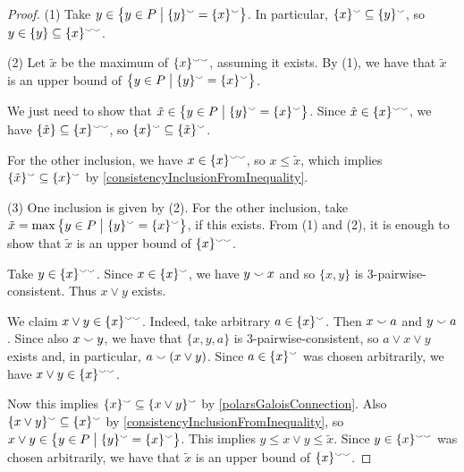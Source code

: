 \begin{proof}
(1) Take $y\in \setbuilder[\big]{y\in P}{\{y\}^\cons = \{x\}^\cons}$. In particular, $\{x\}^\smallsmile \subseteq \{y\}^\smallsmile$, so $y\in \{y\} \subseteq \{x\}^{\smallsmile\smallsmile}$.

(2) Let $\tilde{x}$ be the maximum of $\{x\}^{\smallsmile\smallsmile}$, assuming it exists. By (1), we have that $\tilde{x}$ is an upper bound of $\setbuilder[\big]{y\in P}{\{y\}^\cons = \{x\}^\cons}$.

We just need to show that $\tilde{x} \in \setbuilder[\big]{y\in P}{\{y\}^\cons = \{x\}^\cons}$. Since $\tilde{x} \in \{x\}^{\smallsmile\smallsmile}$, we have $\{\tilde{x}\} \subseteq \{x\}^{\smallsmile\smallsmile}$, so $\{x\}^\smallsmile \subseteq \{\tilde{x}\}^\smallsmile$.

For the other inclusion, we have $x\in \{x\}^{\smallsmile\smallsmile}$, so $x \leq \tilde{x}$, which implies $\{\tilde{x}\}^\smallsmile \subseteq \{x\}^\smallsmile$ by \ref{consistencyInclusionFromInequality}.

(3) One inclusion is given by (2). For the other inclusion, take $\tilde{x} = \max \setbuilder[\big]{y\in P}{ \{y\}^\cons = \{x\}^\cons }$, if this exists. From (1) and (2), it is enough to show that $\tilde{x}$ is an upper bound of $\{x\}^{\smallsmile\smallsmile}$.

Take $y\in \{x\}^{\smallsmile\smallsmile}$. Since $x\in \{x\}^\smallsmile$, we have $y \smallsmile x$ and so $\{x,y\}$ is $3$-pairwise-consistent. Thus $x\vee y$ exists.

We claim $x\vee y\in \{x\}^{\smallsmile\smallsmile}$. Indeed, take arbitrary $a\in \{x\}^\smallsmile$. Then $x\smallsmile a$ and $y \smallsmile a$. Since also $x\smallsmile y$, we have that $\{x,y,a\}$ is $3$-pairwise-consistent, so $a\vee x \vee y$ exists and, in particular, $a \smallsmile (x\vee y)$. Since $a\in \{x\}^\smallsmile$ was chosen arbitrarily, we have $x\vee y \in \{x\}^{\smallsmile\smallsmile}$.

Now this implies $\{x\}^\smallsmile \subseteq \{x\vee y\}^{\smallsmile}$ by \ref{polarsGaloisConnection}. Also $\{x\vee y\}^\smallsmile \subseteq \{x\}^\smallsmile$ by \ref{consistencyInclusionFromInequality}, so $x\vee y \in \setbuilder[\big]{y\in P}{ \{y\}^\cons = \{x\}^\cons }$. This implies $y \leq x\vee y \leq \tilde{x}$. Since $y\in \{x\}^{\smallsmile\smallsmile}$ was chosen arbitrarily, we have that $\tilde{x}$ is an upper bound of $\{x\}^{\smallsmile\smallsmile}$.
\end{proof}

